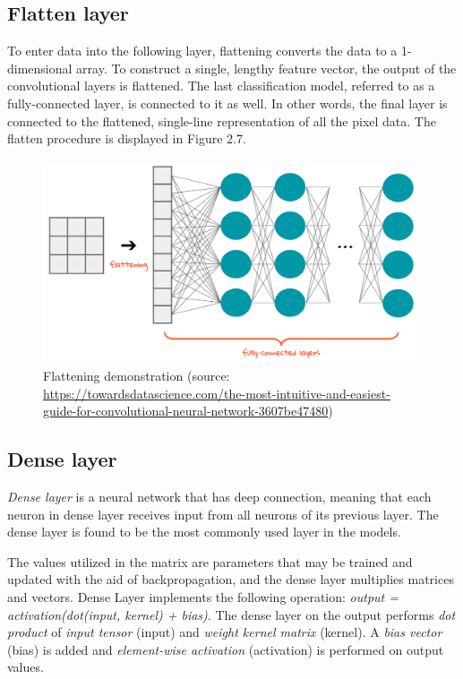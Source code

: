 \subsection{Flatten layer}
\hspace{0.5cm}To enter data into the following layer, flattening converts the data to a 1-dimensional array. To construct a single, lengthy feature vector, the output of the convolutional layers is flattened. The last classification model, referred to as a fully-connected layer, is connected to it as well. In other words, the final layer is connected to the flattened, single-line representation of all the pixel data. The flatten procedure is displayed in Figure 2.7.
\begin{figure}[!h]
	\centering
	\includegraphics[width=\linewidth, height=6cm,keepaspectratio]{figures/flattening.png}
   \caption{Flattening demonstration (source: \url{https://towardsdatascience.com/the-most-intuitive-and-easiest-guide-for-convolutional-neural-network-3607be47480})}
\end{figure}
\subsection{Dense layer}
\hspace{0.5cm}\emph{Dense layer} is a neural network that has deep connection, meaning that each neuron in dense layer receives input from all neurons of its previous layer. The dense layer is found to be the most commonly used layer in the models.

The values utilized in the matrix are parameters that may be trained and updated with the aid of backpropagation, and the dense layer multiplies matrices and vectors. Dense Layer implements the following operation: \textit{output = activation(dot(input, kernel) + bias)}. The dense layer on the output performs \textit{dot product} of \textit{input tensor} (input) and \textit{weight kernel matrix} (kernel). A \textit{bias vector} (bias) is added and \textit{element-wise activation} (activation) is performed on output values. 

